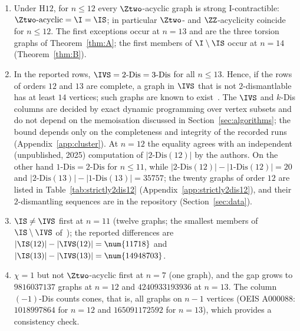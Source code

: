 \begin{observation}\label{obs:table}
\begin{enumerate}[label=(\roman*)]
\item Under $\mathrm{H12}$, for $n\le12$ every $\Ztwo$-acyclic graph is strong I-contractible: $\Ztwo\text{-acyclic}=\I=\IS$; in particular $\Ztwo$- and $\ZZ$-acyclicity coincide for $n\le12$. The first exceptions occur at $n=13$ and are the three torsion graphs of Theorem~\ref{thm:A}; the first members of $\I\setminus\IS$ occur at $n=14$ (Theorem~\ref{thm:B}).
\item In the reported rows, $\IVS=2\text{-Dis}=3\text{-Dis}$ for all $n\le13$. Hence, if the rows of orders $12$ and $13$ are complete, a graph in $\IVS$ that is not $2$-dismantlable has at least $14$ vertices; such graphs are known to exist~\cite[Proposition~8]{FieuxJouve2020}. The $\IVS$ and $k$-Dis columns are decided by exact dynamic programming over vertex subsets and do not depend on the memoisation discussed in Section~\ref{sec:algorithms}; the bound depends only on the completeness and integrity of the recorded runs (Appendix~\ref{app:cluster}). At $n=12$ the equality agrees with an independent (unpublished, 2025) computation of $|2\text{-Dis}(12)|$ by the authors. On the other hand $1\text{-Dis}=2\text{-Dis}$ for $n\le11$, while $|2\text{-Dis}(12)|-|1\text{-Dis}(12)|=20$ and $|2\text{-Dis}(13)|-|1\text{-Dis}(13)|=\num{35757}$; the twenty graphs of order $12$ are listed in Table~\ref{tab:strictly2dis12} (Appendix~\ref{app:strictly2dis12}), and their $2$-dismantling sequences are in the repository (Section~\ref{sec:data}).
\item $\IS\ne\IVS$ first at $n=11$ (twelve graphs; the smallest members of $\IS\setminus\IVS$ of~\cite{DEFH2023}); the reported differences are $|\IS(12)|-|\IVS(12)|=\num{11718}$ and $|\IS(13)|-|\IVS(13)|=\num{14948703}$.
\item $\chi=1$ but not $\Ztwo$-acyclic first at $n=7$ (one graph), and the gap grows to $\num{9816037137}$ graphs at $n=12$ and $\num{4240933193936}$ at $n=13$. The column $(-1)$-Dis counts cones, that is, all graphs on $n-1$ vertices (OEIS A000088: $\num{1018997864}$ for $n=12$ and $\num{165091172592}$ for $n=13$), which provides a consistency check.
\end{enumerate}
\end{observation}

